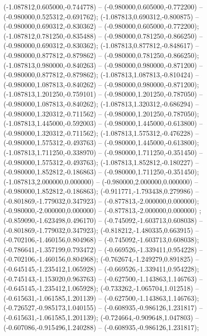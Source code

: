  (-1.087812,0.605000,-0.744778) -- (-0.980000,0.605000,-0.772200) -- (-0.980000,0.525312,-0.691762);
 (-1.087813,0.690312,-0.800875) -- (-0.980000,0.690312,-0.830362) -- (-0.980000,0.605000,-0.772200);
 (-1.087812,0.781250,-0.835488) -- (-0.980000,0.781250,-0.866250) -- (-0.980000,0.690312,-0.830362);
 (-1.087813,0.877812,-0.848617) -- (-0.980000,0.877812,-0.879862) -- (-0.980000,0.781250,-0.866250);
 (-1.087813,0.980000,-0.840263) -- (-0.980000,0.980000,-0.871200) -- (-0.980000,0.877812,-0.879862);
 (-1.087813,1.087813,-0.810424) -- (-0.980000,1.087813,-0.840262) -- (-0.980000,0.980000,-0.871200);
 (-1.087813,1.201250,-0.759101) -- (-0.980000,1.201250,-0.787050) -- (-0.980000,1.087813,-0.840262);
 (-1.087813,1.320312,-0.686294) -- (-0.980000,1.320312,-0.711562) -- (-0.980000,1.201250,-0.787050);
 (-1.087813,1.445000,-0.592003) -- (-0.980000,1.445000,-0.613800) -- (-0.980000,1.320312,-0.711562);
 (-1.087813,1.575312,-0.476228) -- (-0.980000,1.575312,-0.493763) -- (-0.980000,1.445000,-0.613800);
 (-1.087813,1.711250,-0.338970) -- (-0.980000,1.711250,-0.351450) -- (-0.980000,1.575312,-0.493763);
 (-1.087813,1.852812,-0.180227) -- (-0.980000,1.852812,-0.186863) -- (-0.980000,1.711250,-0.351450);
 (-1.087813,2.000000,0.000000) -- (-0.980000,2.000000,0.000000) -- (-0.980000,1.852812,-0.186863);
 (-0.911771,-1.793438,0.279986) -- (-0.801869,-1.779032,0.347923) -- (-0.877813,-2.000000,0.000000);
 (-0.980000,-2.000000,0.000000) -- (-0.877813,-2.000000,0.000000) ;
 (-0.859090,-1.623498,0.496170) -- (-0.745092,-1.603713,0.608038) -- (-0.801869,-1.779032,0.347923);
 (-0.818212,-1.480335,0.663915) -- (-0.702106,-1.460156,0.804968) -- (-0.745092,-1.603713,0.608038);
 (-0.786641,-1.357199,0.793472) -- (-0.669526,-1.339411,0.954228) -- (-0.702106,-1.460156,0.804968);
 (-0.762674,-1.249279,0.891825) -- (-0.645145,-1.235412,1.065928) -- (-0.669526,-1.339411,0.954228);
 (-0.745143,-1.153020,0.963763) -- (-0.627500,-1.143863,1.146763) -- (-0.645145,-1.235412,1.065928);
 (-0.733262,-1.065704,1.012518) -- (-0.615631,-1.061585,1.201139) -- (-0.627500,-1.143863,1.146763);
 (-0.726527,-0.985173,1.040155) -- (-0.608935,-0.986126,1.231817) -- (-0.615631,-1.061585,1.201139);
 (-0.724664,-0.909648,1.047803) -- (-0.607086,-0.915496,1.240288) -- (-0.608935,-0.986126,1.231817);

